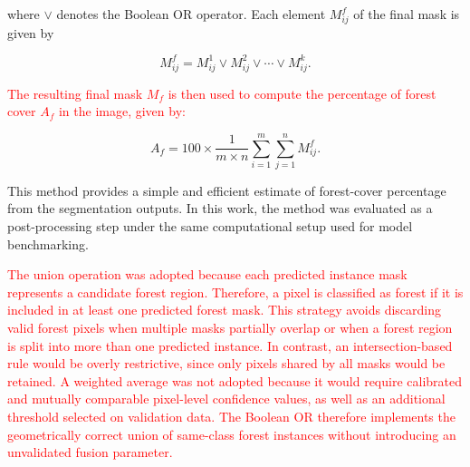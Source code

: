 \documentclass[journal,article,submit,pdftex,moreauthors]{Definitions/mdpi}
\begin{document}
where $\lor$ denotes the Boolean OR operator. Each element $M_{ij}^f$ of the
final mask is given by

\begin{equation}
M_{ij}^f = M_{ij}^1 \lor M_{ij}^2 \lor \cdots \lor M_{ij}^k.
\end{equation}

\textcolor{red}{The resulting final mask $M_f$ is then used to compute the percentage of forest cover $A_f$ in the image, given by:}

{\color{red}
\begin{equation}
    A_f = 100 \times \frac{1}{m\times n}\sum_{i=1}^{m} \sum_{j=1}^{n} M_{ij}^f.
\end{equation}
}

This method provides a simple and efficient estimate of forest-cover percentage
from the segmentation outputs. In this work, the method was evaluated as a
post-processing step under the same computational setup used for model
benchmarking.

\textcolor{red}{The union operation was adopted because each predicted instance mask represents
a candidate forest region. Therefore, a pixel is classified as forest if it is
included in at least one predicted forest mask. This strategy avoids discarding
valid forest pixels when multiple masks partially overlap or when a forest
region is split into more than one predicted instance. In contrast, an
intersection-based rule would be overly restrictive, since only pixels shared by
all masks would be retained. A weighted average was not adopted because it would
require calibrated and mutually comparable pixel-level confidence values, as well as an additional threshold selected on validation data. The Boolean OR therefore implements the geometrically correct union of same-class forest instances without introducing an unvalidated fusion parameter.}
\end{document}
